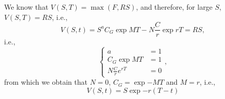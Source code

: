 We know that $V(S,T) = \max(F, RS)$, and therefore, for large $S$, $V(S,T) = RS$, i.e., 
$$
		V(S,t) = S^a  C_G \exp{M T} - N \frac{C}{r}\exp{rT} = RS,
$$
i.e., 
$$
	\begin{cases}
		a &= 1\\
		C_G \exp{MT} &= 1\\
		N\frac{C}{r}e^{rT} &= 0
	\end{cases},
$$
from which we obtain that $N = 0$, $C_G = \exp{-MT}$ and $M = r$, i.e., 
\begin{equation}
	V(S,t) = S \exp{-r(T-t)}
\end{equation}